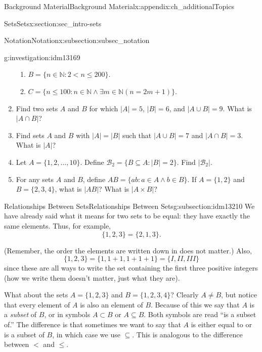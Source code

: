 \documentclass[oneside,10pt,]{book}
\numberwithin{equation}{chapter}
\def\N{\mathbb N}
\def\st{:}
\newcommand{\lt}{<}
\begin{document}
\begin{appendixptx}{Background Material}{}{Background Material}{}{}{x:appendix:ch_additionalTopics}
\begin{sectionptx}{Sets}{}{Sets}{}{}{x:section:sec_intro-sets}
\begin{subsectionptx}{Notation}{}{Notation}{}{}{x:subsection:subsec_notation}
\begin{investigation}{}{g:investigation:idm13169}
\begin{enumerate}
\begin{enumerate}
\item{}\(B = \{n \in \N \st 2 \lt  n \le 200\}\).%
\item{}\(C = \{n \le 100 \st n \in \N \wedge \exists m \in \N (n = 2m+1)\}\).%
\end{enumerate}
%
\item{}Find two sets \(A\) and \(B\) for which \(|A| = 5\), \(|B| = 6\), and \(|A\cup B| = 9\). What is \(|A \cap B|\)?%
\item{}Find sets \(A\) and \(B\) with \(|A| = |B|\) such that \(|A\cup B| = 7\) and \(|A \cap B| = 3\). What is \(|A|\)?%
\item{}Let \(A = \{1,2,\ldots, 10\}\). Define \(\mathcal{B}_2 = \{B \subseteq A \st |B| = 2\}\). Find \(|\mathcal{B}_2|\).%
\item{}For any sets \(A\) and \(B\), define \(AB = \{ab \st a\in A \wedge b \in B\}\). If \(A = \{1,2\}\) and \(B = \{2,3,4\}\), what is \(|AB|\)? What is \(|A \times B|\)?%
\end{enumerate}
%
\end{investigation}
\end{subsectionptx}
%
%
\typeout{************************************************}
\typeout{************************************************}
%
\begin{subsectionptx}{Relationships Between Sets}{}{Relationships Between Sets}{}{}{g:subsection:idm13210}
We have already said what it means for two sets to be equal: they have exactly the same elements. Thus, for example,%
\begin{equation*}
\{1, 2, 3\} = \{2, 1, 3\}.
\end{equation*}
%
\par
(Remember, the order the elements are written down in does not matter.) Also,%
\begin{equation*}
\{1, 2, 3\} = \{1, 1+1, 1+1+1\} = \{I, II, III\}
\end{equation*}
since these are all ways to write the set containing the first three positive integers (how we write them doesn't matter, just what they are).%
\par
What about the sets \(A = \{1, 2, 3\}\) and \(B = \{1, 2, 3, 4\}\)? Clearly \(A \ne B\), but notice that every element of \(A\) is also an element of \(B\). Because of this we say that \(A\) is a \emph{subset}  of \(B\), or in symbols \(A \subset B\) or \(A \subseteq B\). Both symbols are read ``is a subset of.'' The difference is that sometimes we want to say that \(A\) is either equal to or is a subset of \(B\), in which case we use \(\subseteq\). This is analogous to the difference between \(\lt\) and \(\le\).%

\end{subsectionptx}
\end{sectionptx}
\end{appendixptx}
\end{document}
